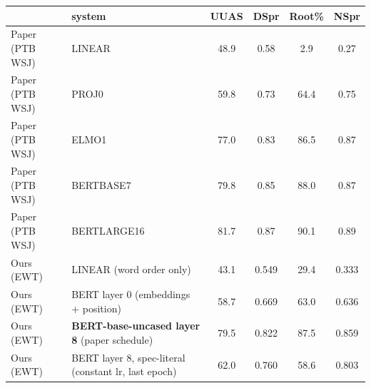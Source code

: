 \begin{tabular}{llcccc}
\toprule
 & system & UUAS & DSpr & Root\% & NSpr \\
\midrule
Paper (PTB WSJ) & LINEAR & 48.9 & 0.58 & 2.9 & 0.27 \\
Paper (PTB WSJ) & PROJ0 & 59.8 & 0.73 & 64.4 & 0.75 \\
Paper (PTB WSJ) & ELMO1 & 77.0 & 0.83 & 86.5 & 0.87 \\
Paper (PTB WSJ) & BERTBASE7 & 79.8 & 0.85 & 88.0 & 0.87 \\
Paper (PTB WSJ) & BERTLARGE16 & 81.7 & 0.87 & 90.1 & 0.89 \\
\midrule
Ours (EWT) & LINEAR (word order only) & 43.1 & 0.549 & 29.4 & 0.333 \\
Ours (EWT) & BERT layer 0 (embeddings + position) & 58.7 & 0.669 & 63.0 & 0.636 \\
Ours (EWT) & \textbf{BERT-base-uncased layer 8} (paper schedule) & 79.5 & 0.822 & 87.5 & 0.859 \\
Ours (EWT) & BERT layer 8, spec-literal (constant lr, last epoch) & 62.0 & 0.760 & 58.6 & 0.803 \\
\bottomrule
\end{tabular}
